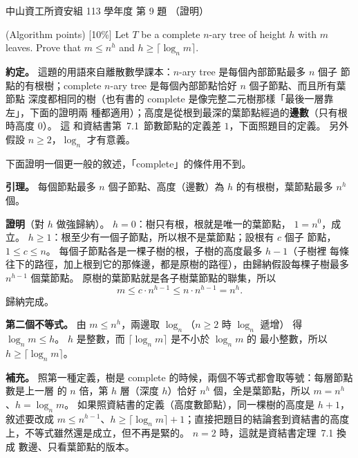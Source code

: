 \begin{pastexam}[label={px:nsysu-113-dmalg-09}]{中山資工所資安組 113 學年度 第 9 題}
（證明）

(Algorithm points) {[10\%]} Let $T$ be a complete $n$-ary tree of height $h$ with $m$ leaves. Prove that
$m\le n^h$ and $h\ge\lceil\log_n m\rceil$.
\end{pastexam}

\begin{pastsoln}
\textbf{約定。} 這題的用語來自離散數學課本：$n$-ary tree 是每個內部節點最多 $n$ 個子
節點的有根樹；complete $n$-ary tree 是每個內部節點恰好 $n$ 個子節點、而且所有葉節點
深度都相同的樹（也有書的 complete 是像完整二元樹那樣「最後一層靠左」，下面的證明兩
種都適用）；高度是從根到最深的葉節點經過的\textbf{邊數}（只有根時高度 $0$）。 這
和資結書第~7.1~節數節點的定義差 $1$，下面照題目的定義。 另外假設
$n \ge 2$，$\log_n$ 才有意義。

下面證明一個更一般的敘述，「complete」的條件用不到。

\textbf{引理。} 每個節點最多 $n$ 個子節點、高度（邊數）為 $h$ 的有根樹，葉節點最多
$n^h$ 個。

\textbf{證明}（對 $h$ 做強歸納）。 $h = 0$：樹只有根，根就是唯一的葉節點，
$1 = n^0$，成立。 $h \ge 1$：根至少有一個子節點，所以根不是葉節點；設根有 $c$ 個子
節點，$1 \le c \le n$。 每個子節點各是一棵子樹的根，子樹的高度最多 $h - 1$（子樹裡
每條往下的路徑，加上根到它的那條邊，都是原樹的路徑），由歸納假設每棵子樹最多
$n^{h-1}$ 個葉節點。 原樹的葉節點就是各子樹葉節點的聯集，所以
\[
m \le c \cdot n^{h-1} \le n \cdot n^{h-1} = n^h .
\]
歸納完成。

\textbf{第二個不等式。} 由 $m \le n^h$，兩邊取 $\log_n$（$n \ge 2$ 時 $\log_n$ 遞增）
得 $\log_n m \le h$。 $h$ 是整數，而 $\lceil \log_n m \rceil$ 是不小於 $\log_n m$ 的
最小整數，所以 $h \ge \lceil \log_n m \rceil$。

\textbf{補充。} 照第一種定義，樹是 complete 的時候，兩個不等式都會取等號：每層節點數是上一層
的 $n$ 倍，第 $h$ 層（深度 $h$）恰好 $n^h$ 個，全是葉節點，所以 $m = n^h$、$h =
\log_n m$。 如果照資結書的定義（高度數節點），同一棵樹的高度是 $h + 1$，敘述要改成
$m \le n^{h-1}$、$h \ge \lceil \log_n m \rceil + 1$；直接把題目的結論套到資結書的高度
上，不等式雖然還是成立，但不再是緊的。 $n = 2$ 時，這就是資結書定理~7.1 換成
數邊、只看葉節點的版本。
\end{pastsoln}

